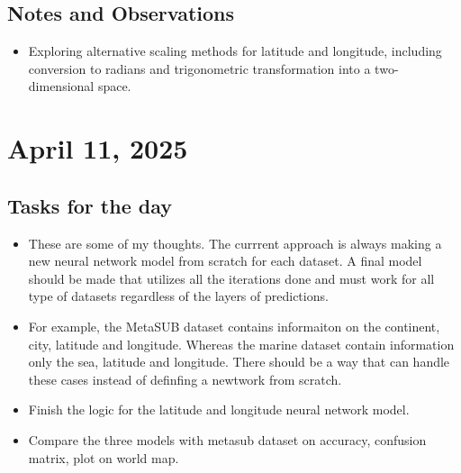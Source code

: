 \documentclass{article}
\begin{document}
\subsection*{Notes and Observations}
\begin{itemize}
    \item Exploring alternative scaling methods for latitude and longitude, including conversion to radians and trigonometric transformation into a two-dimensional space.
\end{itemize}

\section{April 11, 2025}
\subsection*{Tasks for the day}
\begin{itemize}
    \item These are some of my thoughts. The currrent approach is always making a new neural network model from scratch for each dataset. A final model should be made 
    that utilizes all the iterations done and must work for all type of datasets regardless of the layers of predictions. 
    \item For example, the MetaSUB dataset contains informaiton on the continent, city, latitude and longitude. Whereas the marine dataset contain information only the sea, latitude and longitude.
    There should be a way that can handle these cases instead of definfing a newtwork from scratch.
    \item Finish the logic for the latitude and longitude neural network model. 
    \item Compare the three models with metasub dataset on accuracy, confusion matrix, plot on world map.
\end{itemize}
\end{document}
